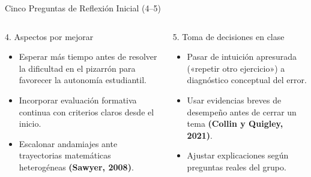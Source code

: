 \documentclass[aspectratio=169,spanish,xcolor=table]{beamer}
\begin{document}
\begin{frame}{Cinco Preguntas de Reflexión Inicial (4--5)}
  \begin{columns}[T]
      \begin{block}{4. Aspectos por mejorar}
        \begin{itemize}\scriptsize
          \item Esperar más tiempo antes de resolver la dificultad en el pizarrón para favorecer la autonomía estudiantil.
          \item Incorporar evaluación formativa continua con criterios claros desde el inicio.
          \item Escalonar andamiajes ante trayectorias matemáticas heterogéneas \textbf{(Sawyer, 2008)}.
        \end{itemize}
      \end{block}
      \begin{block}{5. Toma de decisiones en clase}
        \begin{itemize}\scriptsize
          \item Pasar de intuición apresurada («repetir otro ejercicio») a diagnóstico conceptual del error.
          \item Usar evidencias breves de desempeño antes de cerrar un tema \textbf{(Collin y Quigley, 2021)}.
          \item Ajustar explicaciones según preguntas reales del grupo.
        \end{itemize}
      \end{block}
  \end{columns}
\end{frame}
\end{document}
